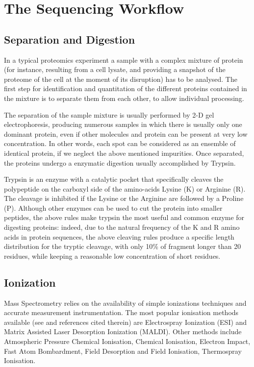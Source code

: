 \section{The Sequencing Workflow}
\subsection{Separation and Digestion}

In a typical proteomics experiment a sample with a complex mixture of protein
(for instance, resulting from a cell lysate, and providing a snapshot of
the proteome of the cell at the moment of its disruption) has to be analysed. 
The first step for identification and quantitation of the different proteins
contained in the mixture is to separate them from each other, to allow
individual processing.

The separation of the sample mixture is usually performed by 2-D gel
electrophoresis, producing numerous samples in which there is usually only one
dominant protein, even if other molecules
and protein can be present at very low concentration. 
In other words, each spot can be considered as an ensemble of identical protein,
if we neglect the above mentioned impurities.
Once separated, the proteins undergo a enzymatic digestion usually accomplished %
by %
Trypsin.

Trypsin is an enzyme  with a catalytic pocket that specifically cleaves the
polypeptide on the carboxyl side of the amino-acids Lysine (K) or Arginine (R).
The cleavage is inhibited if the Lysine or the Arginine are followed by a
Proline (P).
Although other enzymes can be used to cut the protein into smaller peptides, the
above rules make trypsin the most useful and common enzyme for digesting
proteins: indeed, due to the natural frequency of the K and R amino acids in
protein sequences, the above cleaving rules produce  a specific length
distribution for the tryptic cleavage, with only 10\% of fragment longer than 20 residues, while keeping a
reasonable low concentration of short residues.

\subsection{Ionization}

Mass Spectrometry relies on the availability of simple ionizations techniques
and accurate measurement instrumentation.
The most popular ionisation methods available (see
\cite{ashcroft1997ionization-methods} and references cited therein)
are Electrospray Ionization (ESI) and Matrix Assisted Laser Desorption
Ionization (MALDI). Other methods include Atmospheric Pressure Chemical
Ionisation, Chemical Ionisation, Electron Impact, Fast Atom Bombardment, Field
Desorption and Field Ionisation, Thermospray Ionisation.

